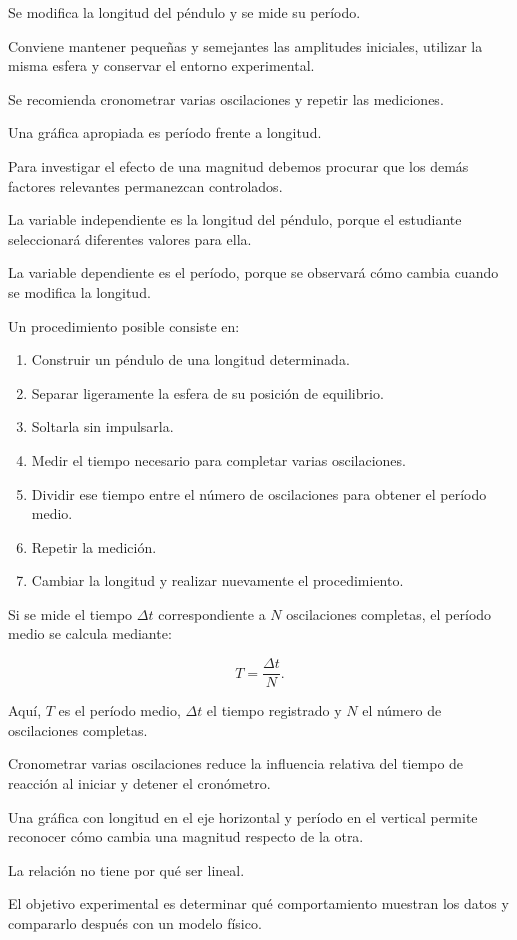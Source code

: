\begin{respuesta}
Se modifica la longitud del péndulo y se mide su período.

Conviene mantener pequeñas y semejantes las amplitudes iniciales, utilizar la misma esfera y conservar el entorno experimental.

Se recomienda cronometrar varias oscilaciones y repetir las mediciones.

Una gráfica apropiada es período frente a longitud.
\end{respuesta}

\begin{explicacion}
Para investigar el efecto de una magnitud debemos procurar que los demás factores relevantes permanezcan controlados.

La variable independiente es la longitud del péndulo, porque el estudiante seleccionará diferentes valores para ella.

La variable dependiente es el período, porque se observará cómo cambia cuando se modifica la longitud.

Un procedimiento posible consiste en:

\begin{enumerate}
    \item Construir un péndulo de una longitud determinada.
    \item Separar ligeramente la esfera de su posición de equilibrio.
    \item Soltarla sin impulsarla.
    \item Medir el tiempo necesario para completar varias oscilaciones.
    \item Dividir ese tiempo entre el número de oscilaciones para obtener el período medio.
    \item Repetir la medición.
    \item Cambiar la longitud y realizar nuevamente el procedimiento.
\end{enumerate}

Si se mide el tiempo \(\Delta t\) correspondiente a \(N\) oscilaciones completas, el período medio se calcula mediante:

\[T=\frac{\Delta t}{N}.\]

Aquí, \(T\) es el período medio, \(\Delta t\) el tiempo registrado y \(N\) el número de oscilaciones completas.

Cronometrar varias oscilaciones reduce la influencia relativa del tiempo de reacción al iniciar y detener el cronómetro.

Una gráfica con longitud en el eje horizontal y período en el vertical permite reconocer cómo cambia una magnitud respecto de la otra.

La relación no tiene por qué ser lineal.

El objetivo experimental es determinar qué comportamiento muestran los datos y compararlo después con un modelo físico.
\end{explicacion}


